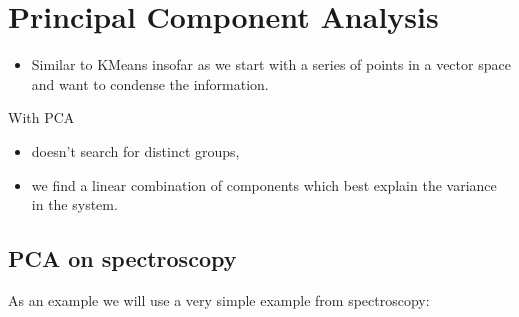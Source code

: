\documentclass[letterpaper,10pt,english]{sphinxmanual}
\begin{document}
\section{Principal Component Analysis}
\label{\detokenize{06-ShapeAnalysis:principal-component-analysis}}\begin{itemize}
\item {} 
\sphinxAtStartPar
Similar to K\sphinxhyphen{}Means insofar as we start with a series of points in a vector space and want to condense the information.

\end{itemize}

\sphinxAtStartPar
With PCA
\begin{itemize}
\item {} 
\sphinxAtStartPar
doesn’t search for distinct groups,

\item {} 
\sphinxAtStartPar
we find a linear combination of components which best explain the variance in the system.

\end{itemize}


\subsection{PCA on spectroscopy}
\label{\detokenize{06-ShapeAnalysis:pca-on-spectroscopy}}
\sphinxAtStartPar
As an example we will use a very simple example from spectroscopy:
\end{document}
